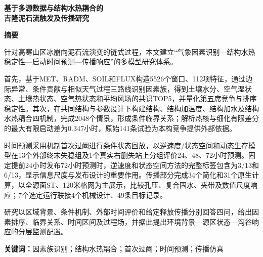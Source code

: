 \thispagestyle{empty}
\begin{center}
{\LARGE\bfseries 基于多源数据与结构水热耦合的\\[0.25em]吉隆泥石流触发及传播研究\par}
\vspace{0.65em}
{\large\bfseries 摘\quad 要}
\end{center}
\begingroup\small
针对高寒山区冰崩向泥石流演变的链式过程，本文建立“气象因素识别—结构水热稳定性—启动时间预测—传播响应”的多模型研究体系。

首先，基于MET、RADM、SOIL和FLUX构造5526个窗口、112项特征，通过边际异常、条件贡献与相似天气过程三路线识别因素族，得到土壤水分、空气湿状态、土壤热状态、空气热状态和平均风场的共识TOP5，并量化第五席竞争与排序稳定性。其次，在共同结构与参数设计下构建结构、结构加温度、结构加水及结构水热耦合四机制，完成2048个情景，形成条件临界关系；解析热核与细化有限差分的最大有限启动差为0.347小时，原始141条试验为本构竞争提供外部依据。

时间预测采用机制首次过阈进行条件状态回放，以逆速度/状态空间和动态生存模型在13个外部终末失稳组及1个真实右删失站上分组评价24、48、72小时预测。固定提前24小时发布72小时预测时，逆速度和状态空间方法的完整标签包含为3/13和6/13，显示信息尺度与发布设计的重要作用。传播部分完成34个简化和31个原生计算，以全源面ST、120米格网为主展示，比较孔压、复合固水、夹带及数值尺度响应；7个选定运行联接4个机械设计、49条目标记录。

研究以区域背景、条件机制、外部时间评价和给定释放传播分别回答四问，给出因素排序、临界关系、时间区间及过程场，并据此提出环境背景—源区状态—沟谷响应的分层监测配置。
\par\vspace{0.6em}\noindent\textbf{关键词：}因素族识别；结构水热耦合；首次过阈；时间预测；传播仿真
\par\vspace{0.7em}
\endgroup
